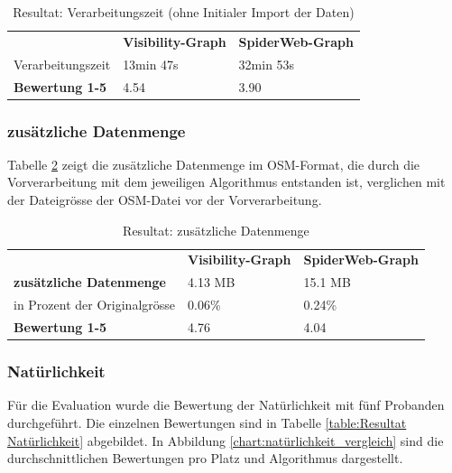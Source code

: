 \begin{table}[H]
    \centering
    \caption{Resultat: Verarbeitungszeit (ohne Initialer Import der Daten)}
    \label{Resultat: Verarbeitungszeit}
    \begin{tabular}{lll}
        & \textbf{Visibility-Graph} & \textbf{SpiderWeb-Graph}     \\
        Verarbeitungszeit  &        13min 47s                   & 32min 53s    \\
        \textbf{Bewertung 1-5} &    4.54                     &  3.90
    \end{tabular}
\end{table}


\subsubsection{zusätzliche Datenmenge}
\label{result:zusätzliche Datenmenge}
Tabelle \ref{table: zusätzliche Datenmenge} zeigt die zusätzliche Datenmenge im \ac{OSM}-Format, die durch die Vorverarbeitung mit dem jeweiligen Algorithmus entstanden ist, verglichen mit der Dateigrösse der \ac{OSM}-Datei vor der Vorverarbeitung.

\begin{table}[H]
    \centering
    \caption{Resultat: zusätzliche Datenmenge}
    \label{table: zusätzliche Datenmenge}
    \begin{tabular}{lll}
        & \textbf{Visibility-Graph} & \textbf{SpiderWeb-Graph} \\
        \textbf{zusätzliche Datenmenge} & 4.13 MB                    & 15.1 MB  \\  
        in Prozent der Originalgrösse   & 0.06\%                     & 0.24\%   \\
        \textbf{Bewertung 1-5}          & 4.76                       & 4.04
    \end{tabular}
\end{table}

\subsubsection{Natürlichkeit}
\label{result:Natürlichkeit}
Für die Evaluation wurde die Bewertung der Natürlichkeit mit fünf Probanden durchgeführt. Die einzelnen Bewertungen sind in Tabelle \ref{table:Resultat Natürlichkeit} abgebildet. In Abbildung \ref{chart:natürlichkeit_vergleich} sind die durchschnittlichen Bewertungen pro Platz und Algorithmus dargestellt.

